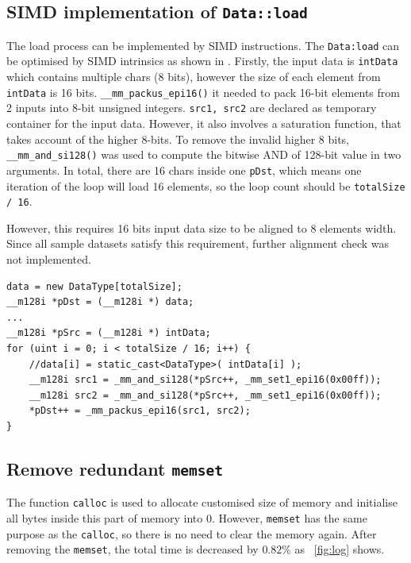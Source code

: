 \documentclass[conference]{IEEEtran}
\newcommand{\fref}[1]{\figurename~\ref{#1}}
\begin{document}



\subsection{SIMD implementation of \texttt{Data::load}} \label{sec:simd}

The load process can be implemented by SIMD instructions. The \texttt{Data:load} can be optimised by SIMD intrinsics as shown in \cite{advnotes}. Firstly, the input data is \texttt{intData} which contains multiple chars (8 bits), however the size of each element from \texttt{intData} is 16 bits. \texttt{\_\_mm\_packus\_epi16()} it needed to pack 16-bit elements from 2 inputs into 8-bit unsigned integers. \texttt{src1, src2} are declared as temporary container for the input data. However, it also involves a saturation function, that takes account of the higher 8-bits. To remove the invalid higher 8 bits, \texttt{\_\_mm\_and\_si128()} was used to compute the bitwise AND of 128-bit value in two arguments. In total, there are 16 chars inside one \texttt{pDst}, which means one iteration of the loop will load 16 elements, so the loop count should be \texttt{totalSize / 16}.

However, this requires 16 bits input data size to be aligned to 8 elements width. Since all sample datasets satisfy this requirement, further alignment check was not implemented.

\begin{lstlisting}[float,floatplacement=t,caption={Data Load with SIMD Intrinsics},captionpos=b,label=lst:mem]
data = new DataType[totalSize];
__m128i *pDst = (__m128i *) data;
...
__m128i *pSrc = (__m128i *) intData;
for (uint i = 0; i < totalSize / 16; i++) {
    //data[i] = static_cast<DataType>( intData[i] );
    __m128i src1 = _mm_and_si128(*pSrc++, _mm_set1_epi16(0x00ff));
    __m128i src2 = _mm_and_si128(*pSrc++, _mm_set1_epi16(0x00ff));
    *pDst++ = _mm_packus_epi16(src1, src2);
}
\end{lstlisting}

\subsection{Remove redundant \texttt{memset}} \label{sec:memset}

The function \texttt{calloc} is used to allocate customised size of memory and initialise all bytes inside this part of memory into 0. However, \texttt{memset} has the same purpose as the \texttt{calloc}, so there is no need to clear the memory again. After removing the \texttt{memset}, the total time is decreased by $0.82 \%$ as \fref{fig:log} shows. 
\end{document}
